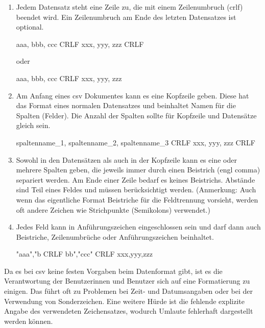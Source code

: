 \begin{enumerate}{}
	
	\item Jedem Datensatz steht eine Zeile zu, die mit einem Zeilenumbruch (\ac{crlf}) beendet wird. Ein Zeilenumbruch am Ende des letzten Datensatzes ist optional. \zB 
	\begin{textcode}
	aaa, bbb, ccc CRLF 
    xxx, yyy, zzz CRLF
	\end{textcode}
	oder
	\begin{textcode}
	aaa, bbb, ccc CRLF
	xxx, yyy, zzz
	\end{textcode}
	
	\item Am Anfang eines \ac{csv} Dokumentes kann es eine Kopfzeile geben. Diese hat das Format eines normalen Datensatzes und beinhaltet Namen für die Spalten (Felder). Die Anzahl der Spalten sollte für Kopfzeile und Datensätze gleich sein. \zB
	\begin{textcode}
	spaltenname_1, spaltenname_2, spaltenname_3 CRLF
	xxx, yyy, zzz CRLF
	\end{textcode}
	
	\item Sowohl in den Datensätzen als auch in der Kopfzeile kann es eine oder mehrere Spalten geben, die jeweils immer durch einen Beistrich (\acs{engl} comma) separiert werden. Am Ende einer Zeile bedarf es keines Beistrichs. Abstände sind Teil eines Feldes und müssen berücksichtigt werden. (Anmerkung: Auch wenn das eigentliche Format Beistriche für die Feldtrennung vorsieht, werden oft andere Zeichen wie \zB Strichpunkte (Semikolons) verwendet.)
	
	\item Jedes Feld kann in Anführungszeichen eingeschlossen sein und darf dann auch Beistriche, Zeilenumbrüche oder Anführungszeichen beinhaltet. \zB
	\begin{textcode}
	"aaa","b CRLF
	bb","ccc" CRLF
	xxx,yyy,zzz
	\end{textcode}
	
\end{enumerate}

Da es bei \ac{csv} keine festen Vorgaben beim Datenformat gibt, ist es die Verantwortung der Benutzerinnen und Benutzer sich auf eine Formatierung zu einigen. Das führt oft zu Problemen bei Zeit- und Datumsangaben oder bei der Verwendung von Sonderzeichen. Eine weitere Hürde ist die fehlende explizite Angabe des verwendeten Zeichensatzes, wodurch \zB Umlaute fehlerhaft dargestellt werden können. \cite[vgl.][]{FuchsMediaSolutions:o.J.}

